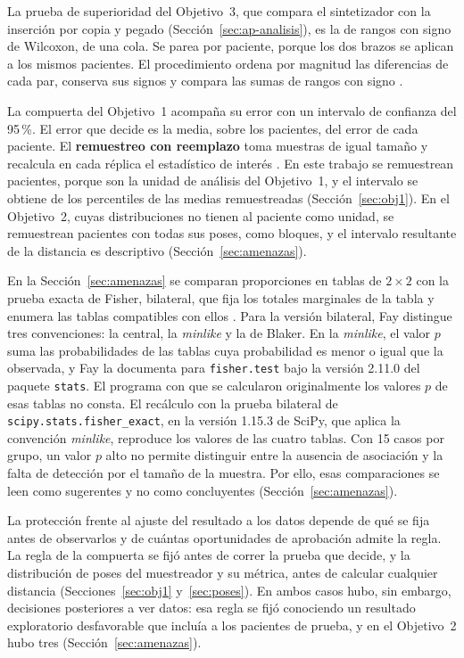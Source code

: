 La prueba de superioridad del Objetivo~3, que compara el sintetizador con la inserción por copia y pegado (Sección~\ref{sec:ap-analisis}), es la de rangos con signo de Wilcoxon, de una cola. Se parea por paciente, porque los dos brazos se aplican a los mismos pacientes. El procedimiento ordena por magnitud las diferencias de cada par, conserva sus signos y compara las sumas de rangos con signo \cite{wilcoxon1945rankingmethods}.

La compuerta del Objetivo~1 acompaña su error con un intervalo de confianza del 95\,\%. El error que decide es la media, sobre los pacientes, del error de cada paciente. El \textbf{remuestreo con reemplazo} toma muestras de igual tamaño y recalcula en cada réplica el estadístico de interés \cite{efron1992bootstrap}. En este trabajo se remuestrean pacientes, porque son la unidad de análisis del Objetivo~1, y el intervalo se obtiene de los percentiles de las medias remuestreadas (Sección~\ref{sec:obj1}). En el Objetivo~2, cuyas distribuciones no tienen al paciente como unidad, se remuestrean pacientes con todas sus poses, como bloques, y el intervalo resultante de la distancia es descriptivo (Sección~\ref{sec:amenazas}).

En la Sección~\ref{sec:amenazas} se comparan proporciones en tablas de $2\times2$ con la prueba exacta de Fisher, bilateral, que fija los totales marginales de la tabla y enumera las tablas compatibles con ellos \cite{fisher1935logic}. Para la versión bilateral, Fay \cite{fay2010two} distingue tres convenciones: la central, la \emph{minlike} y la de Blaker. En la \emph{minlike}, el valor $p$ suma las probabilidades de las tablas cuya probabilidad es menor o igual que la observada, y Fay la documenta para \texttt{fisher.test} bajo la versión 2.11.0 del paquete \texttt{stats}. El programa con que se calcularon originalmente los valores $p$ de esas tablas no consta. El recálculo con la prueba bilateral de \texttt{scipy.stats.fisher\_exact}, en la versión 1.15.3 de SciPy, que aplica la convención \emph{minlike}, reproduce los valores de las cuatro tablas. Con 15 casos por grupo, un valor $p$ alto no permite distinguir entre la ausencia de asociación y la falta de detección por el tamaño de la muestra. Por ello, esas comparaciones se leen como sugerentes y no como concluyentes (Sección~\ref{sec:amenazas}).

La protección frente al ajuste del resultado a los datos depende de qué se fija antes de observarlos y de cuántas oportunidades de aprobación admite la regla. La regla de la compuerta se fijó antes de correr la prueba que decide, y la distribución de poses del muestreador y su métrica, antes de calcular cualquier distancia (Secciones~\ref{sec:obj1} y~\ref{sec:poses}). En ambos casos hubo, sin embargo, decisiones posteriores a ver datos: esa regla se fijó conociendo un resultado exploratorio desfavorable que incluía a los pacientes de prueba, y en el Objetivo~2 hubo tres (Sección~\ref{sec:amenazas}).

